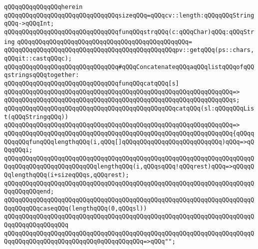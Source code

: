 \verb|qQQqqQQqqQQqqQQqherein|\newline
\newline
\verb|qQQqqQQqqQQqqQQqqQQqqQQqqQQqqQQqsizeqQQq=qQQqcv::length:qQQqqQQqStringqQQq->qQQqInt;|\newline
\newline
\verb|qQQqqQQqqQQqqQQqqQQqqQQqqQQqqQQqfunqQQqstrqQQq(c:qQQqChar)qQQq:qQQqString|\newline
\verb|qQQqqQQqqQQqqQQqqQQqqQQqqQQqqQQqqQQqqQQqqQQqqQQq=|\newline
\verb|qQQqqQQqqQQqqQQqqQQqqQQqqQQqqQQqqQQqqQQqqQQqqQQqpv::getqQQq(ps::chars,qQQqit::castqQQqc);|\newline
\newline
\newline
\verb|qQQqqQQqqQQqqQQqqQQqqQQqqQQqqQQq#qQQqConcatenateqQQqaqQQqlistqQQqofqQQqstringsqQQqtogether:|\newline
\newline
\verb|qQQqqQQqqQQqqQQqqQQqqQQqqQQqqQQqfunqQQqcatqQQq[s]|\newline
\verb|qQQqqQQqqQQqqQQqqQQqqQQqqQQqqQQqqQQqqQQqqQQqqQQqqQQqqQQqqQQqqQQq=>|\newline
\verb|qQQqqQQqqQQqqQQqqQQqqQQqqQQqqQQqqQQqqQQqqQQqqQQqqQQqqQQqqQQqqQQqs;|\newline
\newline
\verb|qQQqqQQqqQQqqQQqqQQqqQQqqQQqqQQqqQQqqQQqqQQqqQQqcatqQQq(sl:qQQqqQQqList(qQQqStringqQQq))|\newline
\verb|qQQqqQQqqQQqqQQqqQQqqQQqqQQqqQQqqQQqqQQqqQQqqQQqqQQqqQQqqQQqqQQq=>|\newline
\verb|qQQqqQQqqQQqqQQqqQQqqQQqqQQqqQQqqQQqqQQqqQQqqQQqqQQqqQQqqQQqqQQq{qQQqqQQqqQQqfunqQQqlengthqQQq(i,qQQq[]qQQqqQQqqQQqqQQqqQQqqQQqqQQq)qQQq=>qQQqqQQqi;|\newline
\verb|qQQqqQQqqQQqqQQqqQQqqQQqqQQqqQQqqQQqqQQqqQQqqQQqqQQqqQQqqQQqqQQqqQQqqQQqqQQqqQQqqQQqqQQqqQQqqQQqlengthqQQq(i,qQQqsqQQq!qQQqrest)qQQq=>qQQqqQQqlengthqQQq(i+sizeqQQqs,qQQqrest);|\newline
\verb|qQQqqQQqqQQqqQQqqQQqqQQqqQQqqQQqqQQqqQQqqQQqqQQqqQQqqQQqqQQqqQQqqQQqqQQqqQQqqQQqend;|\newline
\newline
\verb|qQQqqQQqqQQqqQQqqQQqqQQqqQQqqQQqqQQqqQQqqQQqqQQqqQQqqQQqqQQqqQQqqQQqqQQqqQQqqQQqcaseqQQq(lengthqQQq(0,qQQqsl))|\newline
\verb|qQQqqQQqqQQqqQQqqQQqqQQqqQQqqQQqqQQqqQQqqQQqqQQqqQQqqQQqqQQqqQQqqQQqqQQqqQQqqQQqqQQqqQQq|\newline
\verb|qQQqqQQqqQQqqQQqqQQqqQQqqQQqqQQqqQQqqQQqqQQqqQQqqQQqqQQqqQQqqQQqqQQqqQQqqQQqqQQqqQQqqQQqqQQqqQQq0qQQqqQQqqQQq=>qQQq"";|\newline
